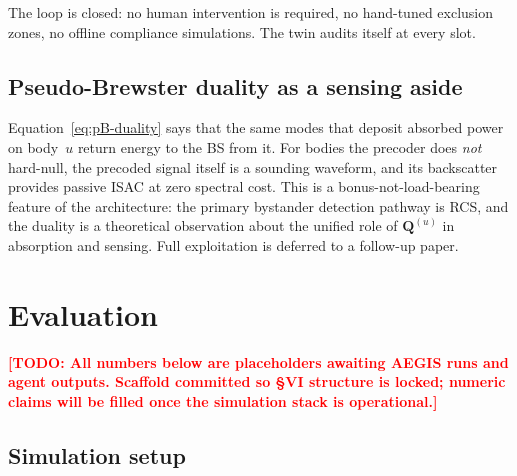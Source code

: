 \documentclass[journal,twoside,onecolumn]{IEEEtran}
\theoremstyle{definition}
\newcommand{\TODO}[1]{\textcolor{red}{\textbf{[TODO: #1]}}}
\newcommand{\Q}{\mathbf{Q}}
\begin{document}
The loop is closed: no human intervention is required, no
hand-tuned exclusion zones, no offline compliance simulations. The
twin audits itself at every slot.

\subsection{Pseudo-Brewster duality as a sensing aside}

Equation~\eqref{eq:pB-duality} says that the same modes that
deposit absorbed power on body~$u$ return energy to the BS from
it. For bodies the precoder does \emph{not} hard-null, the
precoded signal itself is a sounding waveform, and its backscatter
provides passive ISAC at zero spectral cost. This is a
bonus-not-load-bearing feature of the architecture: the primary
bystander detection pathway is RCS, and the duality is a
theoretical observation about the unified role of $\Q^{(u)}$ in
absorption and sensing. Full exploitation is deferred to a
follow-up paper.

\section{Evaluation}\label{sec:eval}

\TODO{All numbers below are placeholders awaiting AEGIS runs and
agent outputs. Scaffold committed so §VI structure is locked;
numeric claims will be filled once the simulation stack is
operational.}

\subsection{Simulation setup}
\end{document}
